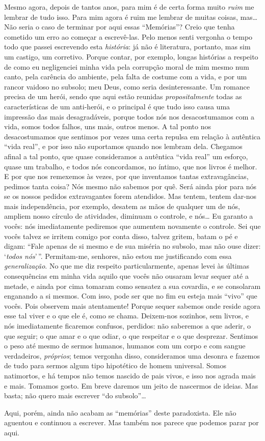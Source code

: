 Mesmo agora, depois de tantos anos, para mim é de certa forma muito
\textit{ruim} me lembrar de tudo isso. Para mim agora é ruim me lembrar
de muitas coisas, mas\ldots{} Não seria o caso de terminar por aqui essas
“Memórias”? Creio que tenha cometido um erro ao começar a escrevê-las.
Pelo menos senti vergonha o tempo todo que passei escrevendo esta
\textit{história}: já não é literatura, portanto, mas sim um castigo,
um corretivo. Porque contar, por exemplo, longas histórias a respeito
de como eu negligenciei minha vida pela corrupção moral de mim mesmo
num canto, pela carência do ambiente, pela falta de costume com a vida,
e por um rancor vaidoso no subsolo; meu Deus, como seria
desinteressante. Um romance precisa de um herói, sendo que aqui estão
reunidas \textit{propositalmente} todas as características de um
anti-herói, e o principal é que tudo isso causa uma impressão das mais
desagradáveis, porque todos nós nos desacostumamos com a vida, somos
todos falhos, uns mais, outros menos. A tal ponto nos desacostumamos que
sentimos por vezes uma certa repulsa em relação à autêntica “vida
real”, e por isso não suportamos quando nos lembram dela. Chegamos
afinal a tal ponto, que quase consideramos a autêntica “vida real” um
esforço, quase um trabalho, e todos nós concordamos, no íntimo, que nos
livros é melhor. E por que nos remexemos às vezes, por que inventamos
tantas extravagâncias, pedimos tanta coisa? Nós mesmo não sabemos por
quê. Será ainda pior para nós se os nossos pedidos extravagantes forem
atendidos. Mas tentem, tentem dar-nos mais independência, por exemplo,
desatem as mãos de qualquer um de nós, ampliem nosso círculo de
atividades, diminuam o controle, e nós\ldots{} Eu garanto a vocês: nós
imediatamente pediremos que aumentem novamente o controle. Sei que
vocês talvez se irritem comigo por conta disso, talvez gritem, batam o
pé e digam: “Fale apenas de si mesmo e de sua miséria no subsolo, mas
não ouse dizer: ‘\textit{todos nós}’\,”. Permitam-me,
senhores, não estou me justificando com essa \textit{generalização}. No
que me diz respeito particularmente, apenas levei às últimas
consequências em minha vida aquilo que vocês não ousaram levar sequer
até a metade, e ainda por cima tomaram como sensatez a sua covardia, e
se consolaram enganando a si mesmos. Com isso, pode ser que no fim eu
esteja mais “vivo” que vocês. Pois observem mais atentamente! Porque
sequer sabemos onde reside agora esse tal viver e o que ele é, como se
chama. Deixem-nos sozinhos, sem livros, e nós imediatamente ficaremos
confusos, perdidos: não saberemos a que aderir, o que seguir; o que
amar e o que odiar, o que respeitar e o que desprezar. Sentimos o peso
até mesmo de sermos humanos, humanos com um corpo e com sangue
verdadeiros, \textit{próprios}; temos vergonha disso, consideramos uma
desonra e fazemos de tudo para sermos algum tipo hipotético de homem
universal. Somos natimortos, e há tempos não temos nascido de pais
vivos, e isso nos agrada mais e mais. Tomamos gosto. Em breve daremos
um jeito de nascermos de ideias. Mas basta; não quero mais escrever “do
subsolo”\ldots{}

Aqui, porém, ainda não acabam as “memórias” deste paradoxista. Ele não
aguentou e continuou a escrever. Mas também nos parece que podemos
parar por aqui.


